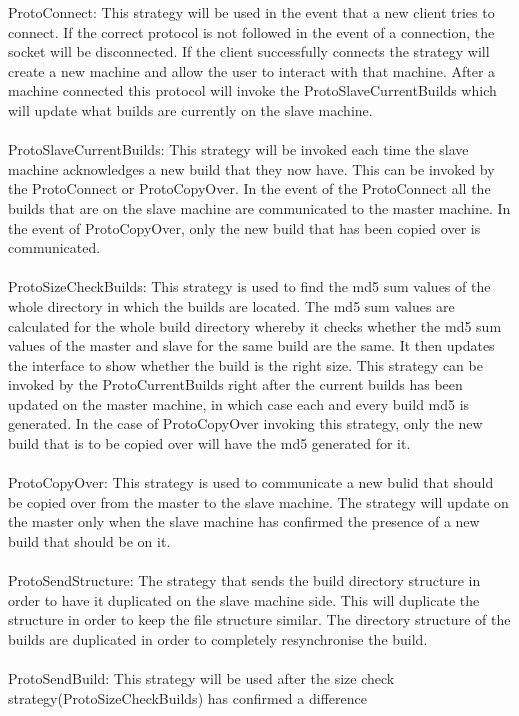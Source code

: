 \documentclass[a4paper,12pt,final]{article}
\begin{document}
ProtoConnect: This strategy will be used in the event that a new client tries to connect. If 
the correct protocol is not followed in the event of a connection, the socket will be disconnected.
If the client successfully connects the strategy will create a new machine and allow the user to
interact with that machine. After a machine connected this protocol will invoke the ProtoSlaveCurrentBuilds
which will update what builds are currently on the slave machine.
\\
\textbf{\\}
ProtoSlaveCurrentBuilds: This strategy will be invoked each time the slave machine 
acknowledges a new build that they now have. This can be invoked by the ProtoConnect or
ProtoCopyOver. In the event of the ProtoConnect all the builds that are on the slave machine are
communicated to the master machine. In the event of ProtoCopyOver, only the new build that
has been copied over is communicated.
\\
\textbf{\\}
ProtoSizeCheckBuilds: This strategy is used to find the md5 sum values of the whole 
directory in which the builds are located. The md5 sum values are calculated for the whole
build directory whereby it checks whether the md5 sum values of the master and slave for the
same build are the same. It then updates the interface to show whether the build is the right size. 
This strategy can be invoked by the ProtoCurrentBuilds right after the current builds has been
updated on the master machine, in which case each and every build md5 is generated. In the case
of ProtoCopyOver invoking this strategy, only the new build that is to be copied over will have the md5
generated for it.
\\
\textbf{\\}
ProtoCopyOver: This strategy is used to communicate a new bulid that should be copied over
from the master to the slave machine. The strategy will update on the master only when the
slave machine has confirmed the presence of a new build that should be on it. 
\\
\textbf{\\}
ProtoSendStructure: The strategy that sends the build directory structure in order to have it duplicated on the slave
machine side. This will duplicate the structure in order to keep the file structure similar. The directory structure of the
builds are duplicated in order to completely resynchronise the build.
\\
\textbf{\\}
ProtoSendBuild: This strategy will be used after the size check strategy(ProtoSizeCheckBuilds) has confirmed a difference
\end{document}
